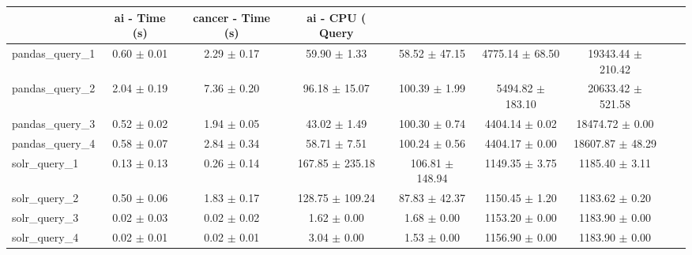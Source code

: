 \begin{tabular}{lcccccccc}
\toprule
 & ai - Time (s) & cancer - Time (s) & ai - CPU (%
Query &  &  &  &  &  &  \\
\midrule
pandas_query_1 & 0.60 \(\pm\) 0.01 & 2.29 \(\pm\) 0.17 & 59.90 \(\pm\) 1.33 & 58.52 \(\pm\) 47.15 & 4775.14 \(\pm\) 68.50 & 19343.44 \(\pm\) 210.42 \\
pandas_query_2 & 2.04 \(\pm\) 0.19 & 7.36 \(\pm\) 0.20 & 96.18 \(\pm\) 15.07 & 100.39 \(\pm\) 1.99 & 5494.82 \(\pm\) 183.10 & 20633.42 \(\pm\) 521.58 \\
pandas_query_3 & 0.52 \(\pm\) 0.02 & 1.94 \(\pm\) 0.05 & 43.02 \(\pm\) 1.49 & 100.30 \(\pm\) 0.74 & 4404.14 \(\pm\) 0.02 & 18474.72 \(\pm\) 0.00 \\
pandas_query_4 & 0.58 \(\pm\) 0.07 & 2.84 \(\pm\) 0.34 & 58.71 \(\pm\) 7.51 & 100.24 \(\pm\) 0.56 & 4404.17 \(\pm\) 0.00 & 18607.87 \(\pm\) 48.29 \\
solr_query_1 & 0.13 \(\pm\) 0.13 & 0.26 \(\pm\) 0.14 & 167.85 \(\pm\) 235.18 & 106.81 \(\pm\) 148.94 & 1149.35 \(\pm\) 3.75 & 1185.40 \(\pm\) 3.11 \\
solr_query_2 & 0.50 \(\pm\) 0.06 & 1.83 \(\pm\) 0.17 & 128.75 \(\pm\) 109.24 & 87.83 \(\pm\) 42.37 & 1150.45 \(\pm\) 1.20 & 1183.62 \(\pm\) 0.20 \\
solr_query_3 & 0.02 \(\pm\) 0.03 & 0.02 \(\pm\) 0.02 & 1.62 \(\pm\) 0.00 & 1.68 \(\pm\) 0.00 & 1153.20 \(\pm\) 0.00 & 1183.90 \(\pm\) 0.00 \\
solr_query_4 & 0.02 \(\pm\) 0.01 & 0.02 \(\pm\) 0.01 & 3.04 \(\pm\) 0.00 & 1.53 \(\pm\) 0.00 & 1156.90 \(\pm\) 0.00 & 1183.90 \(\pm\) 0.00 \\
\bottomrule
\end{tabular}
